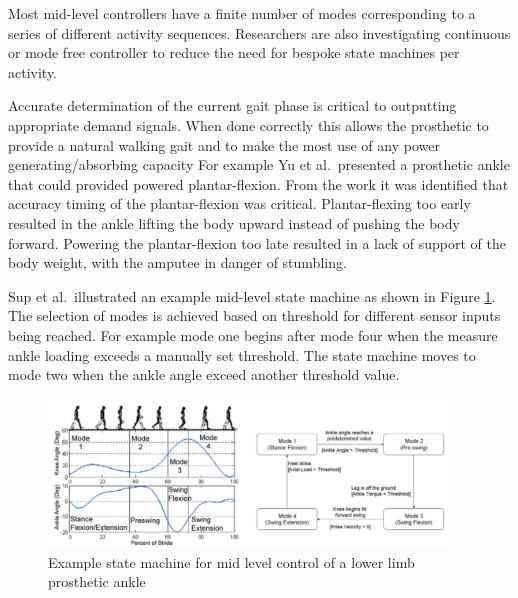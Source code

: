 Most mid-level controllers have a finite number of modes corresponding to a series of different activity sequences. Researchers are also investigating continuous or mode free controller to reduce the need for bespoke state machines per activity.\cite{Rai2019b, Bartlett2021}

Accurate determination of the current gait phase is critical to outputting appropriate demand signals. When done correctly this allows the prosthetic to provide a natural walking gait and to make the most use of any power generating/absorbing capacity
For example Yu et al.~presented a prosthetic ankle that could provided powered plantar-flexion. From the work it was identified that accuracy timing of the plantar-flexion was critical. Plantar-flexing  too early resulted in the ankle lifting the body upward instead of pushing the body forward. Powering the plantar-flexion too late resulted in a lack of support of the body weight, with the amputee in danger of stumbling.\cite{Yu2019}

Sup et al.~illustrated an example mid-level state machine as shown in Figure \ref{fig:mid-level-state-machine}. The selection of modes is achieved based on threshold for different sensor inputs being reached. For example mode one begins after mode four when the measure ankle loading exceeds a manually set threshold. The state machine moves to mode two when the ankle angle exceed another threshold value.\cite{Sup2008b}

\begin{figure}[!hbt]
    \centering
    \includegraphics[width=0.95\textwidth]{content/2-Background/state_machine_based_mid_level_controller.pdf}
    \caption[Example state machine for mid level control of a lower limb prosthetic ankle]{Example state machine for mid level control of a lower limb prosthetic ankle \cite{Sup2008b}}
    \label{fig:mid-level-state-machine}
\end{figure}

